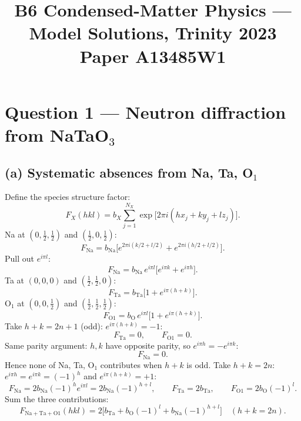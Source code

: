 \documentclass[11pt]{article}
\title{B6 Condensed-Matter Physics --- Model Solutions, Trinity 2023\\
\large Paper A13485W1}
\author{}
\date{}
\begin{document}
\maketitle

\section*{Question 1 --- Neutron diffraction from \texorpdfstring{NaTaO$_3$}{NaTaO3}}

\subsection*{(a) Systematic absences from Na, Ta, O$_1$}

Define the species structure factor:
\begin{equation}
F_X(hkl)=b_X\sum_{j=1}^{N_X}\exp\!\bigl[2\pi i(hx_j+ky_j+lz_j)\bigr].
\label{eq:Fdef}
\end{equation}
Na at $(0,\tfrac12,\tfrac12)$ and $(\tfrac12,0,\tfrac12)$:
\begin{equation}
F_{\mathrm{Na}}=b_{\mathrm{Na}}\bigl[e^{2\pi i(k/2+l/2)}+e^{2\pi i(h/2+l/2)}\bigr].
\end{equation}
Pull out $e^{i\pi l}$:
\begin{equation}
F_{\mathrm{Na}}=b_{\mathrm{Na}}\,e^{i\pi l}\bigl[e^{i\pi k}+e^{i\pi h}\bigr].
\label{eq:Fna}
\end{equation}
Ta at $(0,0,0)$ and $(\tfrac12,\tfrac12,0)$:
\begin{equation}
F_{\mathrm{Ta}}=b_{\mathrm{Ta}}\bigl[1+e^{i\pi(h+k)}\bigr].
\label{eq:Fta}
\end{equation}
O$_1$ at $(0,0,\tfrac12)$ and $(\tfrac12,\tfrac12,\tfrac12)$:
\begin{equation}
F_{\mathrm{O1}}=b_{\mathrm{O}}\,e^{i\pi l}\bigl[1+e^{i\pi(h+k)}\bigr].
\label{eq:Fo1}
\end{equation}
Take $h+k=2n+1$ (odd): $e^{i\pi(h+k)}=-1$:
\begin{equation}
F_{\mathrm{Ta}}=0,\qquad F_{\mathrm{O1}}=0.
\end{equation}
Same parity argument: $h,k$ have opposite parity, so $e^{i\pi h}=-e^{i\pi k}$:
\begin{equation}
F_{\mathrm{Na}}=0.
\end{equation}
Hence none of Na, Ta, O$_1$ contributes when $h+k$ is odd. Take $h+k=2n$: $e^{i\pi h}=e^{i\pi k}=(-1)^h$ and $e^{i\pi(h+k)}=+1$:
\begin{equation}
F_{\mathrm{Na}}=2b_{\mathrm{Na}}(-1)^h e^{i\pi l}=2b_{\mathrm{Na}}(-1)^{h+l},\qquad F_{\mathrm{Ta}}=2b_{\mathrm{Ta}},\qquad F_{\mathrm{O1}}=2b_{\mathrm{O}}(-1)^l.
\end{equation}
Sum the three contributions:
\begin{equation}
\boxed{\,F_{\mathrm{Na+Ta+O1}}(hkl)=2\bigl[b_{\mathrm{Ta}}+b_{\mathrm{O}}(-1)^{l}+b_{\mathrm{Na}}(-1)^{h+l}\bigr]\quad(h+k=2n).\,}
\label{eq:Fmain}
\end{equation}
\end{document}
